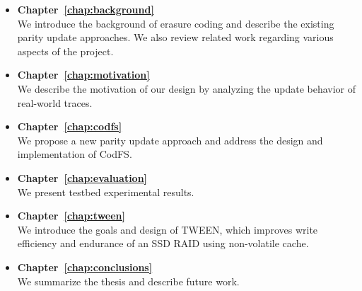 \begin{itemize}
    \item 
        \textbf{Chapter~\ref{chap:background}}\\
        We introduce the background of erasure coding and describe the existing
        parity update approaches. We also review related work regarding various 
        aspects of the project.
    \item
        \textbf{Chapter~\ref{chap:motivation}}\\
        We describe the motivation of our design by analyzing the update
        behavior of real-world traces. 
    \item 
        \textbf{Chapter~\ref{chap:codfs}}\\
        We propose a new parity update approach and 
        address the design and implementation of CodFS. 
    \item 
        \textbf{Chapter~\ref{chap:evaluation}}\\ 
        We present testbed experimental results. 
    \item 
        \textbf{Chapter~\ref{chap:tween}}\\
        We introduce the goals and design of TWEEN, which improves write
        efficiency and endurance of an SSD RAID using non-volatile cache.
    \item 
        \textbf{Chapter~\ref{chap:conclusions}}\\
        We summarize the thesis and describe future work.
\end{itemize}

